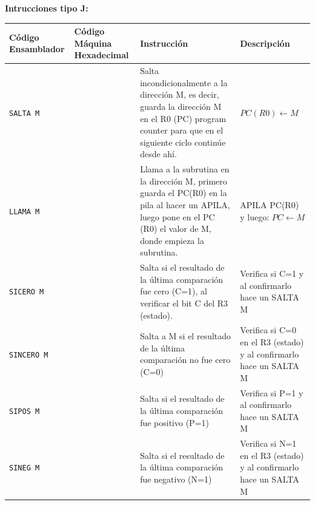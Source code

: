\documentclass{article}
\begin{document}
\textbf{Intrucciones tipo J:}

\begin{longtable}{|p{}|p{}|p{}|p{}|}
  \hline
  \textbf{Código Ensamblador} & \textbf{Código Máquina Hexadecimal} & \textbf{Instrucción}                                               & \textbf{Descripción}                       \\
  \hline
  \texttt{SALTA M}     &  & Salta incondicionalmente a la dirección M, es decir, guarda la dirección M en el R0 (PC) program counter para que en el siguiente ciclo continúe desde ahí.                              & $PC(R0) \leftarrow M$                                                                                                  \\
  \hline
  \texttt{LLAMA M}     &  & Llama a la subrutina en la dirección M, primero guarda el PC(R0) en la pila al hacer un APILA, luego pone en el PC (R0) el valor de M, donde empieza la subrutina.                        & APILA PC(R0) y luego: $PC \leftarrow M$                                                                                \\
  \hline
  \texttt{SICERO M}    &  & Salta si el resultado de la última comparación fue cero (C=1), al verificar el bit C del R3 (estado).                                                                                    & Verifica si C=1 y al confirmarlo hace un SALTA M                                                                       \\
  \hline
  \texttt{SINCERO M}   &  & Salta a M si el resultado de la última comparación no fue cero (C=0)                                                                                                                       & Verifica si C=0 en el R3 (estado) y al confirmarlo hace un SALTA M                                                     \\
  \hline
  \texttt{SIPOS M}     &  & Salta si el resultado de la última comparación fue positivo (P=1)                                                                                                                          & Verifica si P=1 y al confirmarlo hace un SALTA M                                                                       \\
  \hline
  \texttt{SINEG M}     &  & Salta si el resultado de la última comparación fue negativo (N=1)                                                                                                                          & Verifica si N=1 en el R3 (estado) y al confirmarlo hace un SALTA M                                                     \\

\end{longtable}
\end{document}
